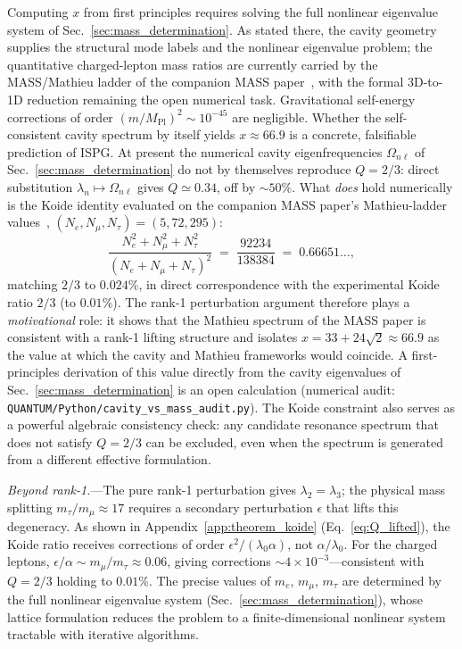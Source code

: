 \documentclass[aps,prd,onecolumn,superscriptaddress,nofootinbib,showpacs,12pt,notitlepage]{revtex4-2}
\newcommand{\Mpl}{M_{\mathrm{Pl}}}
\begin{document}
Computing $x$ from first principles requires solving the
full nonlinear eigenvalue system of
Sec.~\ref{sec:mass_determination}.  As stated there, the
cavity geometry supplies the structural mode labels and
the nonlinear eigenvalue problem; the quantitative
charged-lepton mass ratios are currently carried by the
MASS/Mathieu ladder of the companion MASS
paper~\cite{Lotishvili2026Mass}, with the formal 3D-to-1D
reduction remaining the open numerical task.  Gravitational
self-energy corrections of order $(m/\Mpl)^2 \sim 10^{-45}$
are negligible.
Whether the self-consistent cavity spectrum by itself
yields $x \approx 66.9$ is a concrete, falsifiable
prediction of ISPG.  At present the numerical cavity
eigenfrequencies $\Omega_{n\ell}$ of
Sec.~\ref{sec:mass_determination} do not by themselves
reproduce $Q=2/3$: direct substitution
$\lambda_n \mapsto \Omega_{n\ell}$ gives $Q\simeq 0.34$,
off by $\sim 50\%$.  What \emph{does} hold numerically
is the Koide identity evaluated on the companion MASS
paper's Mathieu-ladder values~\cite{Lotishvili2026Mass},
$(N_e,N_\mu,N_\tau) = (5,72,295)$:
\begin{equation}\label{eq:koide_Nsquare}
  \frac{N_e^{2}+N_\mu^{2}+N_\tau^{2}}
       {(N_e+N_\mu+N_\tau)^{2}}
  \;=\; \frac{92234}{138384}
  \;=\; 0.66651\ldots ,
\end{equation}
matching $2/3$ to $0.024\%$, in direct correspondence with
the experimental Koide ratio $2/3$ (to $0.01\%$).  The rank-1
perturbation argument therefore plays a \emph{motivational}
role: it shows that the Mathieu spectrum of the MASS paper
is consistent with a rank-1 lifting structure and isolates
$x = 33+24\sqrt{2}\approx 66.9$ as the value at which the
cavity and Mathieu frameworks would coincide.  A
first-principles derivation of this value directly from
the cavity eigenvalues of
Sec.~\ref{sec:mass_determination} is an open calculation
(numerical audit: \texttt{QUANTUM/Python/cavity\_vs\_mass\_audit.py}).
The Koide constraint also serves as a powerful algebraic
consistency check: any candidate resonance spectrum that
does not satisfy $Q = 2/3$ can be excluded, even when the
spectrum is generated from a different effective formulation.

\textit{Beyond rank-1.}---The pure rank-1 perturbation
gives $\lambda_2 = \lambda_3$; the physical mass splitting
$m_\tau/m_\mu \approx 17$ requires a secondary perturbation
$\epsilon$ that lifts this degeneracy.  As shown in
Appendix~\ref{app:theorem_koide}
(Eq.~\ref{eq:Q_lifted}), the Koide ratio receives
corrections of order $\epsilon^{2}/(\lambda_{0}\alpha)$,
not $\alpha/\lambda_{0}$.  For the charged leptons,
$\epsilon/\alpha \sim m_\mu/m_\tau \approx 0.06$, giving
corrections $\sim 4 \times 10^{-3}$---consistent with
$Q = 2/3$ holding to $0.01\%$.  The precise values of
$m_e$, $m_\mu$, $m_\tau$ are determined by the full
nonlinear eigenvalue system
(Sec.~\ref{sec:mass_determination}), whose lattice
formulation reduces the problem to a finite-dimensional
nonlinear system tractable with iterative algorithms.
\end{document}
